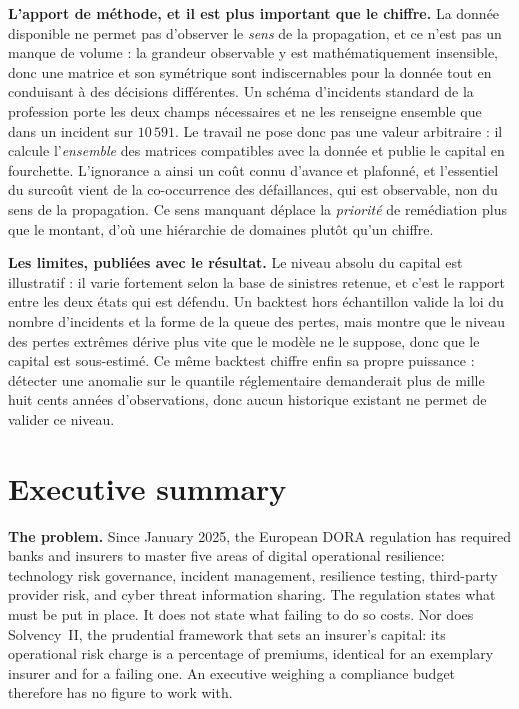 \documentclass[12pt,a4paper]{article}
\theoremstyle{definition}
\begin{document}
\textbf{L'apport de méthode, et il est plus important que le chiffre.} La donnée
disponible ne permet pas d'observer le \emph{sens} de la propagation, et ce n'est
pas un manque de volume : la grandeur observable y est mathématiquement
insensible, donc une matrice et son symétrique sont indiscernables pour la donnée
tout en conduisant à des décisions différentes. Un schéma d'incidents standard de
la profession porte les deux champs nécessaires et ne les renseigne ensemble que
dans un incident sur $10\,591$. Le travail ne pose donc pas une valeur
arbitraire : il calcule l'\emph{ensemble} des matrices compatibles avec la donnée
et publie le capital en fourchette. L'ignorance a ainsi un coût connu d'avance et
plafonné, et l'essentiel du surcoût vient de la co-occurrence des défaillances,
qui est observable, non du sens de la propagation. Ce sens manquant déplace la
\emph{priorité} de remédiation plus que le montant, d'où une hiérarchie de
domaines plutôt qu'un chiffre.

\textbf{Les limites, publiées avec le résultat.} Le niveau absolu du capital est
illustratif : il varie fortement selon la base de sinistres retenue, et c'est le
rapport entre les deux états qui est défendu. Un backtest hors échantillon valide
la loi du nombre d'incidents et la forme de la queue des pertes, mais montre que
le niveau des pertes extrêmes dérive plus vite que le modèle ne le suppose, donc
que le capital est sous-estimé. Ce même backtest chiffre enfin sa propre
puissance : détecter une anomalie sur le quantile réglementaire demanderait plus
de mille huit cents années d'observations, donc aucun historique existant ne
permet de valider ce niveau.

\newpage
\section*{Executive summary}
\vspace{-6pt}


\textbf{The problem.} Since January 2025, the European DORA regulation has
required banks and insurers to master five areas of digital operational
resilience: technology risk governance, incident management, resilience testing,
third-party provider risk, and cyber threat information sharing. The regulation
states what must be put in place. It does not state what failing to do so costs.
Nor does Solvency~II, the prudential framework that sets an insurer's capital: its
operational risk charge is a percentage of premiums, identical for an exemplary
insurer and for a failing one. An executive weighing a compliance budget therefore
has no figure to work with.
\end{document}
